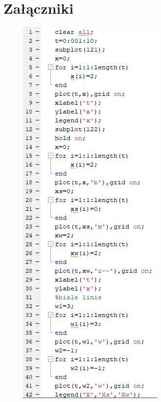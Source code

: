 \documentclass{article}
\begin{document}
\section{Załączniki}
\begin{figure}
    \centering
    \includegraphics{kod1.png}
    \label{fig:my_label}
\end{figure}
\end{document}

